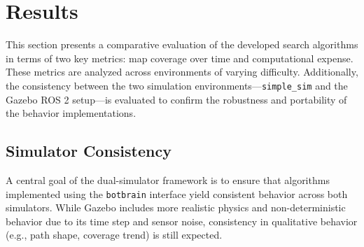 \section{Results}
\label{sec:results}

This section presents a comparative evaluation of the developed search algorithms in terms of two key metrics: map coverage over time and computational expense. These metrics are analyzed across environments of varying difficulty. 
Additionally, the consistency between the two simulation environments—\texttt{simple\_sim} and the Gazebo ROS 2 setup—is evaluated to confirm the robustness and portability of the behavior implementations.
%



\subsection{Simulator Consistency}
A central goal of the dual-simulator framework is to ensure that algorithms implemented using the \texttt{botbrain} interface yield consistent behavior across both simulators. While Gazebo includes more realistic physics and non-deterministic behavior due to its time step and sensor noise, consistency in qualitative behavior (e.g., path shape, coverage trend) is still expected.
